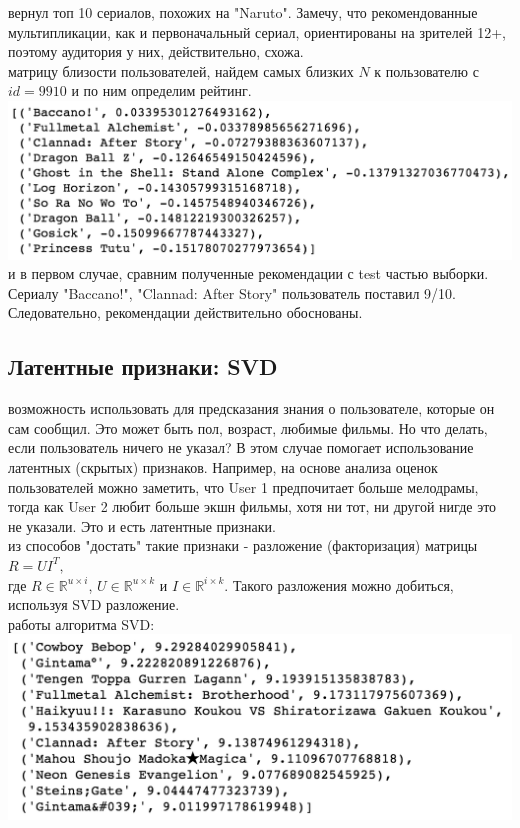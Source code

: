 \documentclass{article}
\newcommand\tab[1][1cm]{\hspace*{#1}}
\begin{document}
 вернул топ 10 сериалов, похожих на "Naruto". Замечу, что рекомендованные мультипликации, как и первоначальный сериал, ориентированы на зрителей 12+, поэтому аудитория у них, действительно, схожа.\\
 матрицу близости пользователей, найдем самых близких $N$ к пользователю с $id=9910$ и по ним определим рейтинг.
\tab\includegraphics[scale=0.8]{f17.png}\\
 и в первом случае, сравним полученные рекомендации с test частью выборки. Сериалу "Baccano!", "Clannad: After Story" пользователь поставил 9/10. Следовательно, рекомендации действительно обоснованы.\\
\subsection{Латентные признаки: SVD}
 возможность использовать для предсказания знания о пользователе, которые он сам сообщил. Это может быть пол, возраст, любимые фильмы. Но что делать, если пользователь ничего не указал? В этом случае помогает использование латентных (скрытых) признаков. Например, на основе анализа оценок пользователей можно заметить, что User 1 предпочитает больше мелодрамы, тогда как User 2 любит больше экшн фильмы, хотя ни тот, ни другой нигде это не указали. Это и есть латентные признаки.\\
 из способов "достать" такие признаки - разложение (факторизация) матрицы\\
\tab$R=UI^T,$\\
где $R\in\mathbb{R}^{u\times{}i}$, $U\in\mathbb{R}^{u\times{}k}$ и $I\in\mathbb{R}^{i\times{}k}$. Такого разложения можно добиться, используя SVD разложение.\\
 работы алгоритма SVD:\\
\tab\includegraphics[scale=0.8]{f18.png}\\
\newpage
\end{document}
